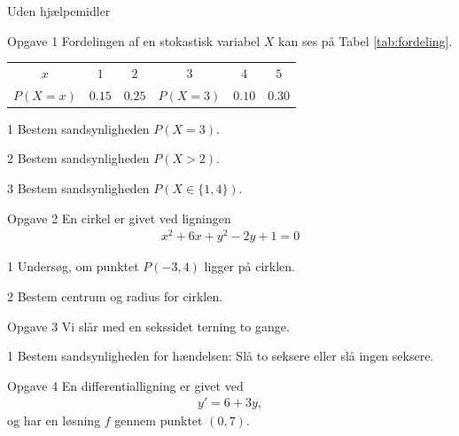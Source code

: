 \documentclass[12pt,x11names,a4paper]{article}
\begin{document}
\newpage
\begin{center}
	\LARGE
	Uden hjælpemidler
\end{center}
\begin{opgavetekst}{Opgave 1}
	Fordelingen af en stokastisk variabel $X$ kan ses på Tabel 
	\ref{tab:fordeling}.
	\begin{table}[H]
		\centering
		\begin{tabular}{cccccc}
		$x$ & $1$ & $2$ & $3$ & $4$ & $5$ \\
		$P(X = x)$ &  $0.15$ & $0.25$ & $P(X = 3)$ & $0.10$ & $0.30$
		\end{tabular}
	\end{table}
	\phantom{h}
\end{opgavetekst}
\begin{delopgave}{1}
	Bestem sandsynligheden $P(X = 3)$. 
\end{delopgave}
\begin{delopgave}{2}
	Bestem sandsynligheden $P(X > 2)$.
\end{delopgave}
\begin{delopgave}{3}
	Bestem sandsynligheden $P(X \in \{1, 4 \})$. 
\end{delopgave}
%
%
%
%
%
%
\begin{opgavetekst}{Opgave 2}
	En cirkel er givet ved ligningen
	\begin{align*}
		x^2 + 6x + y^2 - 2y + 1 = 0
	\end{align*}
\end{opgavetekst}
\begin{delopgave}{1}
	Undersøg, om punktet $P(-3,4)$ ligger på cirklen.
\end{delopgave}
\begin{delopgave}{2}
	Bestem centrum og radius for cirklen. 
\end{delopgave}
%
%
%
%
%
\begin{opgavetekst}{Opgave 3}
	Vi slår med en sekssidet terning to gange.
\end{opgavetekst}
\begin{delopgave}{1}
	Bestem sandsynligheden for hændelsen: Slå to seksere eller slå ingen seksere.
\end{delopgave}
%
%
%
%
%
\newpage
\begin{opgavetekst}{Opgave 4}
	En differentialligning er givet ved
	\begin{align*}
		y' = 6 + 3y,
	\end{align*}
	og har en løsning $f$ gennem punktet $(0,7)$.
\end{opgavetekst}
\end{document}

